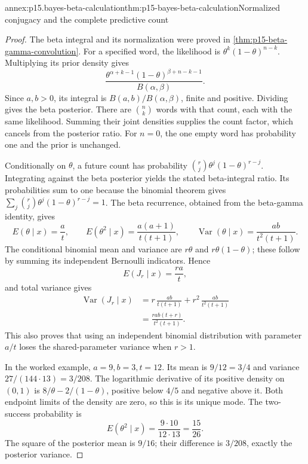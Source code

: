 \begin{annexitem}{annex:p15.bayes-beta-calculation}{thm:p15-bayes-beta-calculation}{Normalized conjugacy and the complete predictive count}
\begin{proof}
The beta integral and its normalization were proved in
\cref{thm:p15-beta-gamma-convolution}. For a specified word,
the likelihood is \(\theta^k(1-\theta)^{n-k}\).
Multiplying its prior density gives
\[
 \frac{\theta^{\alpha+k-1}(1-\theta)^{\beta+n-k-1}}
      {B(\alpha,\beta)}.
\]
Since \(a,b>0\), its integral is
\(B(a,b)/B(\alpha,\beta)\), finite and positive. Dividing
gives the beta posterior. There are \(\binom nk\) words
with that count, each with the same likelihood. Summing
their joint densities supplies the count factor, which
cancels from the posterior ratio. For \(n=0\), the one
empty word has probability one and the prior is unchanged.

Conditionally on \(\theta\), a future count has probability
\(\binom rj\theta^j(1-\theta)^{r-j}\). Integrating against
the beta posterior yields the stated beta-integral ratio.
Its probabilities sum to one because the binomial theorem
gives
\(\sum_j\binom rj\theta^j(1-\theta)^{r-j}=1\).
The beta recurrence, obtained from the beta-gamma identity,
gives
\[
 E(\theta\mid x)=\frac at,\qquad
 E(\theta^2\mid x)=\frac{a(a+1)}{t(t+1)},\qquad
 \operatorname{Var}(\theta\mid x)=\frac{ab}{t^2(t+1)}.
\]
The conditional binomial mean and variance are \(r\theta\)
and \(r\theta(1-\theta)\); these follow by summing its
independent Bernoulli indicators. Hence
\[
 E(J_r\mid x)=\frac{ra}{t},
\]
and total variance gives
\[
 \begin{split}
 \operatorname{Var}(J_r\mid x)
 &=r\,\frac{ab}{t(t+1)}
       +r^2\,\frac{ab}{t^2(t+1)}\\
 &=\frac{rab(t+r)}{t^2(t+1)}.
 \end{split}
\]
This also proves that using an independent binomial
distribution with parameter \(a/t\) loses the shared-parameter
variance when \(r>1\).

In the worked example, \(a=9,b=3,t=12\).
Its mean is \(9/12=3/4\) and variance
\(27/(144\cdot13)=3/208\).
The logarithmic derivative of its positive density on
\((0,1)\) is \(8/\theta-2/(1-\theta)\), positive below
\(4/5\) and negative above it. Both endpoint limits of the
density are zero, so this is its unique mode.
The two-success probability is
\[
 E(\theta^2\mid x)=\frac{9\cdot10}{12\cdot13}
                             =\frac{15}{26}.
\]
The square of the posterior mean is \(9/16\); their
difference is \(3/208\), exactly the posterior variance.
\end{proof}
\end{annexitem}

